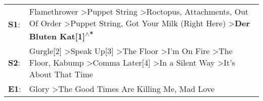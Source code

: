 \begin{supertabular}{p{0.03\textwidth}p{0.92\textwidth}}
 \textbf{S1}:  &                                         Flamethrower\textsuperscript{} \textgreater \enspace Puppet String\textsuperscript{} \textgreater \enspace Roctopus\textsuperscript{}, \enspace Attachments\textsuperscript{}, \enspace Out Of Order\textsuperscript{} \textgreater \enspace Puppet String\textsuperscript{}, \enspace Got Your Milk (Right Here)\textsuperscript{} \textgreater \enspace \textbf{Der Bluten Kat[1]\textsuperscript{$\wedge$*}}  \enspace  \\
 \textbf{S2}:  &  Gurgle[2]\textsuperscript{} \textgreater \enspace Speak Up[3]\textsuperscript{} \textgreater \enspace The Floor\textsuperscript{} \textgreater \enspace I'm On Fire\textsuperscript{} \textgreater \enspace The Floor\textsuperscript{}, \enspace Kabump\textsuperscript{} \textgreater \enspace Comma Later[4]\textsuperscript{} \textgreater \enspace In a Silent Way\textsuperscript{} \textgreater \enspace It's About That Time\textsuperscript{}  \enspace  \\
 \textbf{E1}:  &                                                                                                                                                                                                                                                                                                                      Glory\textsuperscript{} \textgreater \enspace The Good Times Are Killing Me\textsuperscript{}, \enspace Mad Love\textsuperscript{}  \enspace  \\
\end{supertabular}
